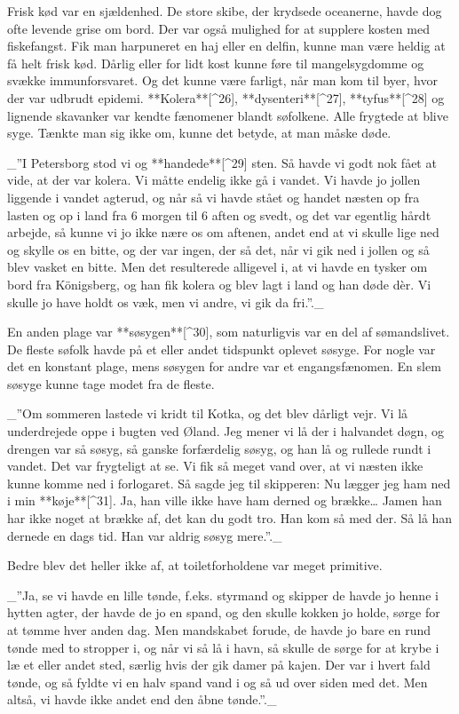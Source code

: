 \documentclass{book}
\begin{document}
Frisk kød var en sjældenhed. De store skibe, der krydsede oceanerne, havde dog ofte
levende grise om bord. Der var også mulighed for at supplere kosten med fiskefangst. Fik
man harpuneret en haj eller en delfin, kunne man være heldig at få helt frisk kød. Dårlig
eller for lidt kost kunne føre til mangelsygdomme og svække immunforsvaret. Og det kunne
være farligt, når man kom til byer, hvor der var udbrudt epidemi. **Kolera**[^26], **dysenteri**[^27], **tyfus**[^28]
og lignende skavanker var kendte fænomener blandt søfolkene. Alle frygtede at blive syge.
Tænkte man sig ikke om, kunne det betyde, at man måske døde.

_”I Petersborg stod vi og **handede**[^29] sten. Så havde vi godt nok fået at vide, at der var
kolera. Vi måtte endelig ikke gå i vandet. Vi havde jo jollen liggende i vandet agterud,
og når så vi havde stået og handet næsten op fra lasten og op i land fra 6 morgen til 6
aften og svedt, og det var egentlig hårdt arbejde, så kunne vi jo ikke nære os om aftenen,
andet end at vi skulle lige ned og skylle os en bitte, og der var ingen, der så det, når
vi gik ned i jollen og så blev vasket en bitte. Men det resulterede alligevel i, at vi
havde en tysker om bord fra Königsberg, og han fik kolera og blev lagt i land og han døde
dèr. Vi skulle jo have holdt os væk, men vi andre, vi gik da fri.”._

En anden plage var **søsygen**[^30], som naturligvis var en del af sømandslivet. De fleste søfolk
havde på et eller andet tidspunkt oplevet søsyge. For nogle var det en konstant plage,
mens søsygen for andre var et engangsfænomen. En slem søsyge kunne tage modet fra de
fleste.

_”Om sommeren lastede vi kridt til Kotka, og det blev dårligt vejr. Vi lå underdrejede oppe
i bugten ved Øland. Jeg mener vi lå der i halvandet døgn, og drengen var så søsyg, så
ganske forfærdelig søsyg, og han lå og rullede rundt i vandet. Det var frygteligt at se.
Vi fik så meget vand over, at vi næsten ikke kunne komme ned i forlogaret. Så sagde jeg
til skipperen: Nu lægger jeg ham ned i min **køje**[^31]. Ja, han ville ikke have ham derned og
brække… Jamen han har ikke noget at brække af, det kan du godt tro. Han kom så med der. Så
lå han dernede en dags tid. Han var aldrig søsyg mere.”._

Bedre blev det heller ikke af, at toiletforholdene var meget primitive.

_”Ja, se vi havde en lille tønde, f.eks. styrmand og skipper de havde jo henne i hytten
agter, der havde de jo en spand, og den skulle kokken jo holde, sørge for at tømme hver
anden dag. Men mandskabet forude, de havde jo bare en rund tønde med to stropper i, og når
vi så lå i havn, så skulle de sørge for at krybe i læ et eller andet sted, særlig hvis der
gik damer på kajen. Der var i hvert fald tønde, og så fyldte vi en halv spand vand i og så
ud over siden med det. Men altså, vi havde ikke andet end den åbne tønde.”._
\end{document}
